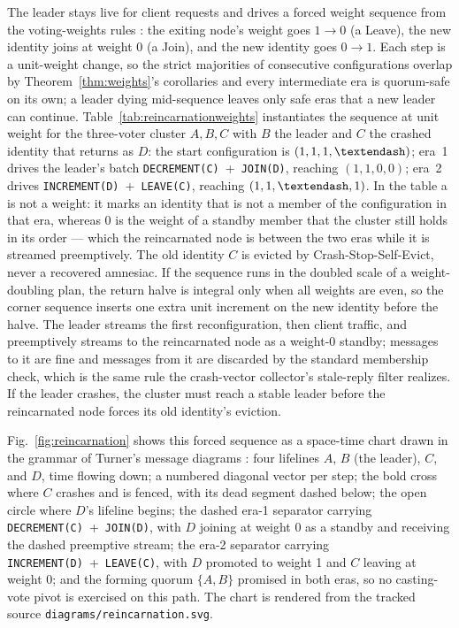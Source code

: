 \documentclass[10pt,journal,letterpaper]{IEEEtran}
\newcommand{\code}[1]{\texttt{\small #1}}
\begin{document}
The leader stays live for client requests and drives a forced weight sequence from
the voting-weights rules \cite{votingweights}: the exiting node's weight goes
$1\to0$ (a Leave), the new identity joins at weight $0$ (a Join), and the new
identity goes $0\to1$. Each step
is a unit-weight change, so the strict majorities of consecutive configurations
overlap by Theorem~\ref{thm:weights}'s corollaries and every intermediate era is
quorum-safe on its own; a leader dying mid-sequence leaves only safe eras that a
new leader can continue. Table~\ref{tab:reincarnationweights} instantiates the
sequence at unit weight for the three-voter cluster $A,B,C$ with $B$ the leader
and $C$ the crashed identity that returns as $D$: the start configuration is
$(1,1,1,\textendash)$; era~1 drives the leader's batch
\code{DECREMENT(C)}~+~\code{JOIN(D)}, reaching $(1,1,0,0)$; era~2 drives
\code{INCREMENT(D)}~+~\code{LEAVE(C)}, reaching $(1,1,\textendash,1)$. In the
table a \textendash{} is not a weight: it marks an identity that is not a member
of the configuration in that era, whereas $0$ is the weight of a standby member
that the cluster still holds in its order --- which the reincarnated node is
between the two eras while it is streamed preemptively. The old identity $C$ is
evicted by Crash-Stop-Self-Evict, never a recovered amnesiac. If the sequence
runs in the doubled scale of a weight-doubling
plan, the return halve is integral only when all weights are even, so the corner
sequence inserts one extra unit increment on the new identity before the halve. The
leader streams the first reconfiguration, then client traffic, and preemptively
streams to the reincarnated node as a weight-0 standby; messages to it are fine and
messages from it are discarded by the standard membership check, which is the same
rule the crash-vector collector's stale-reply filter realizes. If the leader crashes,
the cluster must reach a stable leader before the reincarnated node forces its old
identity's eviction.

Fig.~\ref{fig:reincarnation} shows this forced sequence as a space-time chart
drawn in the grammar of Turner's message diagrams \cite{turner}: four
lifelines $A$, $B$ (the leader), $C$, and $D$, time flowing down; a numbered
diagonal vector per step; the bold cross where $C$ crashes and is fenced,
with its dead segment dashed below; the open circle where $D$'s lifeline
begins; the dashed era-1 separator carrying \code{DECREMENT(C)}~+~\code{JOIN(D)},
with $D$ joining at weight 0 as a standby and receiving the dashed
preemptive stream; the era-2 separator carrying \code{INCREMENT(D)}~+~\code{LEAVE(C)},
with $D$ promoted to weight 1 and $C$ leaving at weight 0; and the forming
quorum $\{A,B\}$ promised in both eras, so no casting-vote pivot is
exercised on this path. The chart is rendered from the tracked source
\code{diagrams/reincarnation.svg}.
\end{document}

